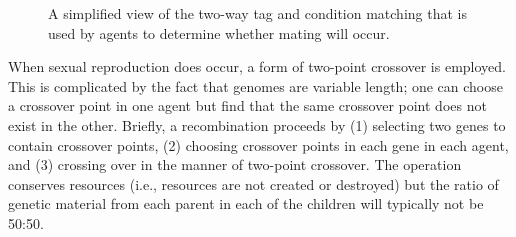 \begin{figure}[htb]
\begin{center}
\leavevmode
{}
\caption{A simplified view of the two-way tag and condition matching
that is used by agents to determine whether mating will occur.
\label{fig:agent-agent}}
\end{center}
\end{figure}

When sexual reproduction does occur, a form of two-point crossover is
employed. This is complicated by the fact that genomes are variable
length; one can choose a crossover point in one agent but find that
the same crossover point does not exist in the other.  Briefly, a
recombination proceeds by (1) selecting two genes to contain crossover
points, (2) choosing crossover points in each gene in each agent, and
(3) crossing over in the manner of two-point crossover. The operation
conserves resources (i.e., resources are not created or destroyed) but
the ratio of genetic material from each parent in each of the children
will typically not be 50:50.

